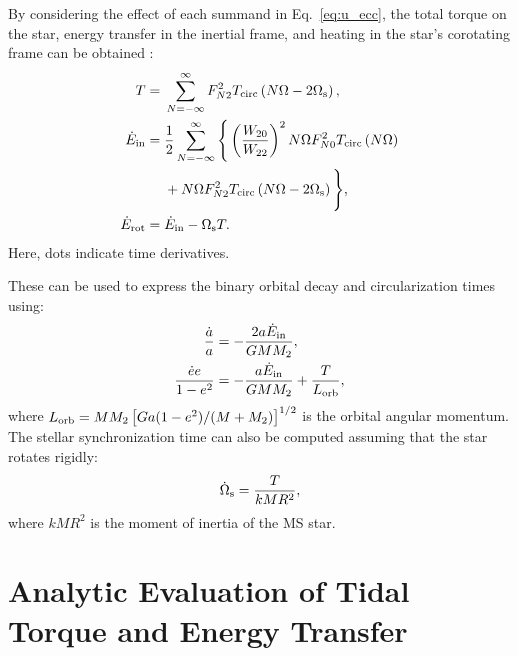 \documentclass[
        fleqn,
        usenatbib,
    ]{mnras}
\newcommand*{\p}[1]{\left(#1\right)}
\newcommand*{\s}[1]{\left[#1\right]}
\begin{document}
By considering the effect of each summand in Eq.~\eqref{eq:u_ecc}, the total
torque on the star, energy transfer in the inertial frame, and heating in the
star's corotating frame can be obtained \citep{sl, vlf}:
\begin{align}
    T ={}& \sum\limits_{N = -\infty}^\infty F_{N2}^2
        T_{\rm circ}\p{N\Omega - 2\Omega_{\rm s}},\label{eq:tau_sum}
        \\
    \dot{E}_{\rm in} ={}&
        \frac{1}{2}\sum\limits_{N = -\infty}^\infty\Bigg\{
            \p{\frac{W_{20}}{W_{22}}}^2 N\Omega F_{N0}^2 T_{\rm circ}\p{N\Omega}
                \nonumber\\
            &+ N\Omega F_{N2}^2 T_{\rm circ}\p{N\Omega - 2\Omega_{\rm s}}
            \Bigg\},\label{eq:edot_in}\\
    \dot{E}_{\rm rot} ={}& \dot{E}_{\rm in} - \Omega_{\rm s} T
        \label{eq:edot_rot}.
\end{align}
Here, dots indicate time derivatives.

These can be used to express the binary orbital decay and circularization times
using:
\begin{align}
    \frac{\dot{a}}{a} &= -\frac{2a\dot{E}_{\rm in}}{GMM_2},
        \label{eq:dota}\\
    \frac{\dot{e}e}{1 - e^2} &= -\frac{a\dot{E}_{\rm in}}{GMM_2} +
        \frac{T}{L_{\rm orb}},\label{eq:dote}
\end{align}
where $L_{\rm orb} = MM_2 \s{Ga(1 - e^2) / (M + M_2)}^{1/2}$ is the orbital
angular momentum. The stellar synchronization time can also be computed assuming
that the star rotates rigidly:
\begin{equation}
    \dot{\Omega}_{\rm s}
        = \frac{T}{kMR^2},\label{eq:dots}
\end{equation}
where $kMR^2$ is the moment of inertia of the MS star.

\section{Analytic Evaluation of Tidal Torque and Energy Transfer}\label{ss:objective}
\end{document}
